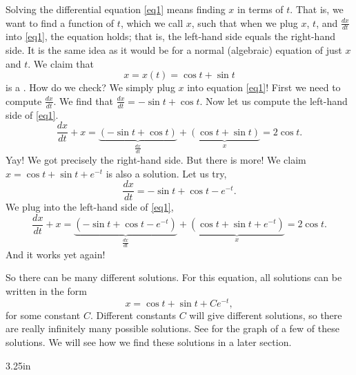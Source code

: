 Solving the differential equation \eqref{eq1} means finding $x$ in terms of $t$.  That
is, we want to find a function of $t$, which we call $x$, such that when
we plug $x$, $t$, and $\frac{dx}{dt}$ into \eqref{eq1}, the equation holds;
that is, the left-hand side equals the right-hand side.
It is
the same idea as it would be for a normal (algebraic) equation of just
$x$ and $t$.  We claim that
\begin{equation*}
x = x(t) = \cos t + \sin t
\end{equation*}
is a \emph{}.
How do we check?  We simply plug $x$ into equation \eqref{eq1}!  First we
need to compute $\frac{dx}{dt}$.  We find that $\frac{dx}{dt} =
-\sin t + \cos t$.  Now let us compute the left-hand side
of \eqref{eq1}.
\begin{equation*}
\frac{dx}{dt} + x =
\underbrace{(-\sin t + \cos t)}_{\frac{dx}{dt}}
+
\underbrace{(\cos t + \sin t)}_{x}
=
2\cos t .
\end{equation*}
Yay!  We got precisely the right-hand side.
But there is more!
We claim
$x = \cos t + \sin t + e^{-t}$ is also
a solution.  Let us try,
\begin{equation*}
\frac{dx}{dt} = -\sin t + \cos t - e^{-t} .
\end{equation*}
We plug into the left-hand side of \eqref{eq1},
\begin{equation*}
\frac{dx}{dt} + x =
\underbrace{(-\sin t + \cos t - e^{-t})}_{\frac{dx}{dt}} +
\underbrace{(\cos t + \sin t + e^{-t})}_{x}
= 2\cos t .
\end{equation*}
And it works yet again!

So there can be many different solutions.  For this equation, all
solutions can be written in the form
\begin{equation*}
x = \cos t + \sin t + C e^{-t} ,
\end{equation*}
for some constant $C$.  Different constants $C$ will give different
solutions, so there are really infinitely many possible solutions.
See  for the graph of a
few of these solutions.
We will see how we find these solutions
in a later section.

\medskip

\begin{mywrapfig}{3.25in}
\capstart
{}
\caption{A few solutions of $\frac{dx}{dt} + x = 2 \cos t$.\label{intro:plotsfig}}
\end{mywrapfig}%


